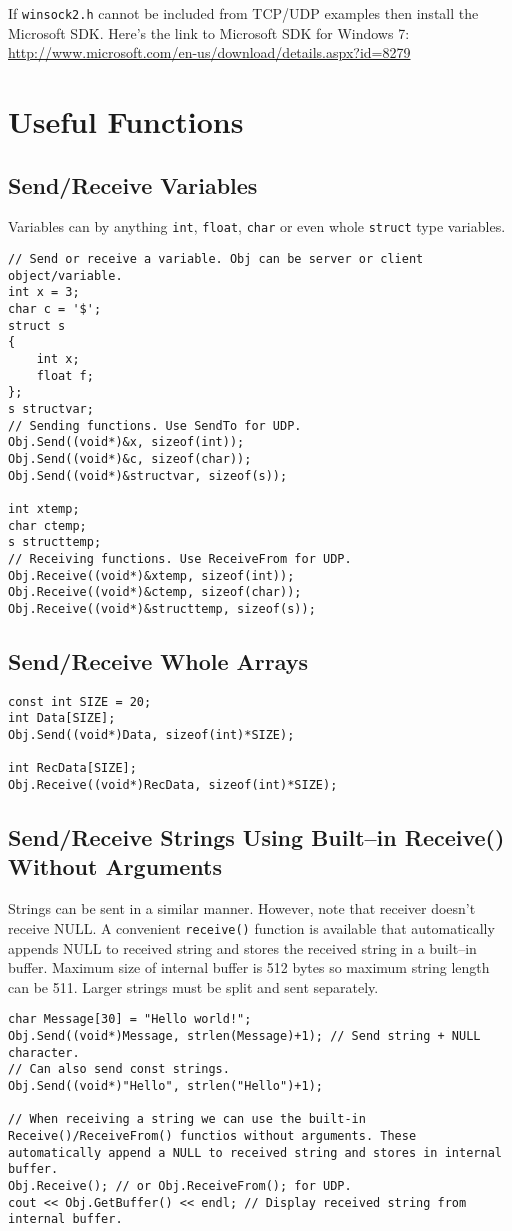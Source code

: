 \documentclass[12pt,a4paper]{article}
\begin{document}
If \verb|winsock2.h| cannot be included from TCP/UDP examples then install the Microsoft SDK. Here's the link to Microsoft SDK  for Windows 7: \url{http://www.microsoft.com/en-us/download/details.aspx?id=8279}
\section{Useful Functions}
\subsection{Send/Receive Variables}
Variables can by anything \verb|int|, \verb|float|, \verb|char| or even whole \verb|struct| type variables.
\begin{lstlisting}
// Send or receive a variable. Obj can be server or client object/variable. 
int x = 3;
char c = '$';
struct s
{
	int x;
	float f;
};
s structvar;
// Sending functions. Use SendTo for UDP.
Obj.Send((void*)&x, sizeof(int));
Obj.Send((void*)&c, sizeof(char));
Obj.Send((void*)&structvar, sizeof(s));

int xtemp;
char ctemp;
s structtemp;
// Receiving functions. Use ReceiveFrom for UDP.
Obj.Receive((void*)&xtemp, sizeof(int));
Obj.Receive((void*)&ctemp, sizeof(char));
Obj.Receive((void*)&structtemp, sizeof(s));
\end{lstlisting}
\subsection{Send/Receive Whole Arrays}
\begin{lstlisting}
const int SIZE = 20;
int Data[SIZE];
Obj.Send((void*)Data, sizeof(int)*SIZE);

int RecData[SIZE];
Obj.Receive((void*)RecData, sizeof(int)*SIZE);
\end{lstlisting}
\subsection{Send/Receive Strings Using Built--in Receive() Without Arguments}
Strings can be sent in a similar manner. However, note that receiver doesn't receive NULL. A convenient \verb|receive()| function is available that automatically appends NULL to received string and stores the received string in a built--in buffer. Maximum size of internal buffer is 512 bytes so maximum string length can be 511. Larger strings must be split and sent separately.
\begin{lstlisting}
char Message[30] = "Hello world!";
Obj.Send((void*)Message, strlen(Message)+1); // Send string + NULL character.
// Can also send const strings.
Obj.Send((void*)"Hello", strlen("Hello")+1);

// When receiving a string we can use the built-in Receive()/ReceiveFrom() functios without arguments. These automatically append a NULL to received string and stores in internal buffer.
Obj.Receive(); // or Obj.ReceiveFrom(); for UDP.
cout << Obj.GetBuffer() << endl; // Display received string from internal buffer.
\end{lstlisting}
\end{document}
